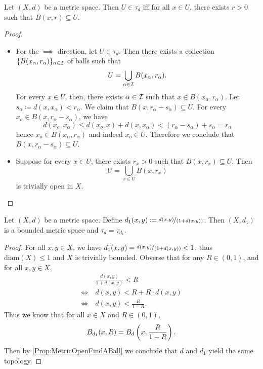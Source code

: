 \documentclass[screen]{techreport}
\numberwithin{equation}{section}
\begin{document}
\begin{proposition}\label{Prop:MetricOpenFindABall}
	Let $(X,d)$ be a metric space. Then $U \in \tau_d$ iff for all $x \in U$, there exists $r >0$ such that $B(x,r) \subseteq U$.
\end{proposition}
\begin{proof}\
	\begin{itemize}
		\item For the ${\implies}$ direction, let $U \in \tau_d$.
		Then there exists a collection $\{B(x_\alpha,r_\alpha)\}_{\alpha \in \mathcal{I}}$ of balls such that
		\[
		U = \bigcup_{\alpha \in \mathcal{I}} B(x_\alpha,r_\alpha).
		\]
		For every $x \in U$, then, there exists $\alpha \in \mathcal{I}$ such that $x \in B(x_\alpha,r_\alpha)$.
		Let $s_\alpha \coloneqq d(x,x_\alpha) < r_\alpha$.
		We claim that $B(x,r_\alpha-s_\alpha) \subseteq U$.
		For every $x_o \in B(x,r_\alpha-s_\alpha)$, we have
		\[
		d(x_o,x_\alpha) \le d(x_o,x) + d(x,x_\alpha) < (r_\alpha - s_\alpha) + s_\alpha = r_\alpha
		\]
		hence $x_o \in B(x_\alpha,r_\alpha)$ and indeed $x_o \in U$.
		Therefore we conclude that $B(x,r_\alpha-s_\alpha) \subseteq U$.
		
		\item Suppose for every $x \in U$, there exists $r_x > 0$ such that $B(x,r_x) \subseteq U$.
		Then
		\[
		U = \bigcup_{x \in U} B(x,r_x)
		\]
		is trivially open in $X$.
	\end{itemize}
\end{proof}

\begin{proposition}\label{Prop:MetricCanAlwaysBounded}
	Let $(X,d)$ be a metric space.
	Define $d_1(x,y) \coloneqq \nicefrac{d(x,y)}{(1 + d(x,y))}$.
	Then $(X,d_1)$ is a bounded metric space and $\tau_d = \tau_{d_1}$.
\end{proposition}
\begin{proof}
	For all $x,y \in X$, we have $d_1(x,y) = \nicefrac{d(x,y)}{(1+d(x,y))} < 1$, thus $\mathrm{diam}(X) \le 1$ and $X$ is trivially bounded.
	Obverse that for any $R \in (0,1)$, and for all $x, y \in X$,
	\begin{align*}
		& \frac{d(x,y)}{1+d(x,y)} < R \\
		\iff~ & d(x,y) < R + R \cdot d(x,y) \\
		\iff~ & d(x,y) < \frac{R}{1-R}.
	\end{align*}
	Thus we know that for all $x \in X$ and $R \in (0,1)$,
	\[
	B_{d_1}(x,R) = B_d\left({x, \frac{R}{1-R} }\right).
	\]
	Then by \cref{Prop:MetricOpenFindABall} we conclude that $d$ and $d_1$ yield the same topology.
\end{proof}
\end{document}
